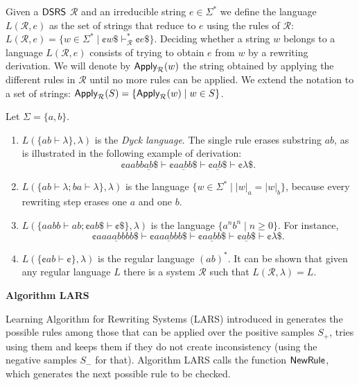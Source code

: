 Given a $\mbox{\sf DSRS}$ $\mathcal{R}$ and an irreducible string $e \in \Sigma^*$ we define the language $L(\mathcal{R}, e)$ as the set of strings that reduce to $e$ using the rules of $\mathcal{R}$: $L(\mathcal{R}, e) = \{ w \in \Sigma^* \mid \cent w \$ \vdash_{\mathcal{R}}^* \cent e \$ \}.$ Deciding whether a string $w$ belongs to a language $L(\mathcal{R}, e)$ consists of trying to obtain $e$ from $w$ by a rewriting derivation. We will denote by $\Apply_{\mathcal{R}}(w)$ the string obtained by applying the different rules in $\mathcal{R}$ until no more rules can be applied. We extend the notation to a set of strings: $\Apply_{\mathcal{R}}(S) = \{\Apply_{\mathcal{R}}(w) \mid w \in S\}$.

\begin{example}
Let $\Sigma = \{a, b\}$. 
\begin{enumerate}
\item $L(\{ab \vdash \lambda\}, \lambda)$ is the \emph{Dyck language}. The single rule erases substring $ab$, as is illustrated in the following example of derivation:
$$\cent aabb \underline{ab} \$ \vdash
\cent a \underline{ab} b \$ \vdash
\cent \underline{ab} \$ \vdash
\cent \lambda \$.$$
\item $L(\{ab \vdash \lambda; ba \vdash \lambda\}, \lambda)$ is the language $\{w \in \Sigma^* \mid |w|_a = |w|_b\}$, because every rewriting step erases one $a$ and one $b$.
\item $L(\{aabb \vdash ab; \cent ab \$ \vdash \cent \$\}, \lambda)$ is the language $\{a^n b^n \mid n \ge 0\}$. For instance, 
$$\cent aa \underline{aabb} bb \$ \vdash
\cent a \underline{aabb} b \$ \vdash
\cent \underline{aabb} \$ \vdash
\cent \underline{ab} \$ \vdash
\cent \lambda \$.$$
\item $L(\{\cent ab \vdash \cent \}, \lambda)$ is the regular language $(ab)^*$. It can be shown that given any regular language $L$ there is a system $\mathcal{R}$ such that $L(\mathcal{R}, \lambda) = L$.
\end{enumerate}
\end{example}

{\bf Algorithm LARS}\label{section:lars}

Learning Algorithm for Rewriting Systems (LARS) introduced in \cite{Eyraud2007} generates the possible rules among those that can be applied over the positive samples $S_+$, tries using them and keeps them if they do not create inconsistency (using the negative samples $S_-$ for that). Algorithm LARS calls the function $\NewRule$, which generates the next possible rule to be checked.

